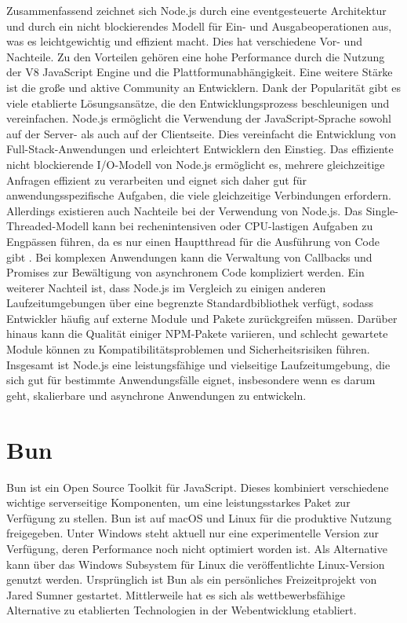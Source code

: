\noindent
Zusammenfassend zeichnet sich Node.js durch eine eventgesteuerte Architektur und durch ein nicht blockierendes Modell für Ein- und Ausgabeoperationen aus, was es leichtgewichtig und effizient macht. Dies hat verschiedene Vor- und Nachteile. \newline
Zu den Vorteilen gehören eine hohe Performance durch die Nutzung der V8 JavaScript Engine und die Plattformunabhängigkeit. Eine weitere Stärke ist die große und aktive Community an Entwicklern. Dank der Popularität gibt es viele etablierte Lösungsansätze, die den Entwicklungsprozess beschleunigen und vereinfachen. \cite{OpenJSFoundation.2022} Node.js ermöglicht die Verwendung der JavaScript-Sprache sowohl auf der Server- als auch auf der Clientseite. Dies vereinfacht die Entwicklung von Full-Stack-Anwendungen und erleichtert Entwicklern den Einstieg. \cite{Brown.November2019} Das effiziente nicht blockierende I/O-Modell von Node.js ermöglicht es, mehrere gleichzeitige Anfragen effizient zu verarbeiten und eignet sich daher gut für anwendungsspezifische Aufgaben, die viele gleichzeitige Verbindungen erfordern.   \newline
Allerdings existieren auch Nachteile bei der Verwendung von Node.js. Das Single-Threaded-Modell kann bei rechenintensiven oder CPU-lastigen Aufgaben zu Engpässen führen, da es nur einen Hauptthread für die Ausführung von Code gibt  \cite{Chhetri.2016}. Bei komplexen Anwendungen kann die Verwaltung von Callbacks und Promises zur Bewältigung von asynchronem Code kompliziert werden.  \newline
Ein weiterer Nachteil ist, dass Node.js im Vergleich zu einigen anderen Laufzeitumgebungen über eine begrenzte Standardbibliothek verfügt, sodass Entwickler häufig auf externe Module und Pakete zurückgreifen müssen. Darüber hinaus kann die Qualität einiger NPM-Pakete variieren, und schlecht gewartete Module können zu Kompatibilitätsproblemen und Sicherheitsrisiken führen.  \newline
Insgesamt ist Node.js eine leistungsfähige und vielseitige Laufzeitumgebung, die sich gut für bestimmte Anwendungsfälle eignet, insbesondere wenn es darum geht, skalierbare und asynchrone Anwendungen zu entwickeln. 

\section{Bun} \label{sec:Bun}
Bun ist ein Open Source Toolkit für JavaScript. Dieses kombiniert verschiedene wichtige serverseitige Komponenten, um eine leistungsstarkes Paket zur Verfügung zu stellen. Bun ist auf macOS und Linux für die produktive Nutzung freigegeben. Unter Windows steht aktuell nur eine experimentelle Version zur Verfügung, deren Performance noch nicht optimiert worden ist. Als Alternative kann über das Windows Subsystem für Linux die veröffentlichte Linux-Version genutzt werden. \cite{Sumner.2023} Ursprünglich ist Bun als ein persönliches Freizeitprojekt von Jared Sumner gestartet. Mittlerweile hat es sich als wettbewerbsfähige Alternative zu etablierten Technologien in der Webentwicklung etabliert. \cite{Tyson.2023}\\

